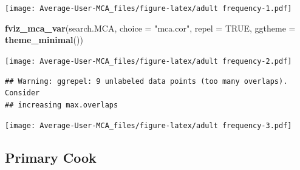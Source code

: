 \documentclass[
]{article}
\newenvironment{Shaded}{\begin{snugshade}}{\end{snugshade}}
\newcommand{\DataTypeTok}[1]{\textcolor[rgb]{0.13,0.29,0.53}{#1}}
\newcommand{\KeywordTok}[1]{\textcolor[rgb]{0.13,0.29,0.53}{\textbf{#1}}}
\newcommand{\NormalTok}[1]{#1}
\newcommand{\OperatorTok}[1]{\textcolor[rgb]{0.81,0.36,0.00}{\textbf{#1}}}
\newcommand{\OtherTok}[1]{\textcolor[rgb]{0.56,0.35,0.01}{#1}}
\newcommand{\StringTok}[1]{\textcolor[rgb]{0.31,0.60,0.02}{#1}}
\begin{document}
\texttt{[image: Average-User-MCA\_files/figure-latex/adult frequency-1.pdf]}

\begin{Shaded}
\begin{Highlighting}[]
\KeywordTok{fviz_mca_var}\NormalTok{(search.MCA, }\DataTypeTok{choice =} \StringTok{"mca.cor"}\NormalTok{, }\DataTypeTok{repel =} \OtherTok{TRUE}\NormalTok{,}
             \DataTypeTok{ggtheme =} \KeywordTok{theme_minimal}\NormalTok{())}
\end{Highlighting}
\end{Shaded}

\texttt{[image: Average-User-MCA\_files/figure-latex/adult frequency-2.pdf]}

\begin{Shaded}
\end{Shaded}

\begin{verbatim}
## Warning: ggrepel: 9 unlabeled data points (too many overlaps). Consider
## increasing max.overlaps
\end{verbatim}

\texttt{[image: Average-User-MCA\_files/figure-latex/adult frequency-3.pdf]}

\hypertarget{primary-cook}{%
\subsection{Primary Cook}\label{primary-cook}}

\begin{Shaded}
\end{Shaded}
\end{document}
